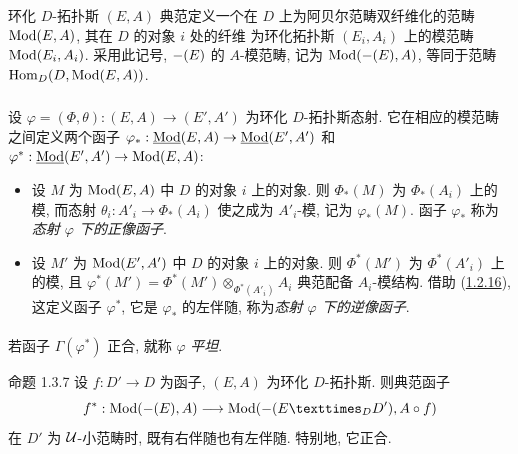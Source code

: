 \subsubsection{}
环化 $D$-拓扑斯 $(E,A)$ 典范定义一个在 $D$ 上为阿贝尔范畴双纤维化的范畴
$\Ysheaf{\Mod}(E,A)$, 其在 $D$ 的对象 $i$ 处\pageoriginale{}的纤维
为环化拓扑斯 $(E_i,A_i)$ 上的模范畴 $\operatorname{Mod}(E_i,A_i)$.
采用此记号, $\Ysheaf{\Gamma}(E)$ 的 $A$-模范畴,
记为 $\Mod(\Ysheaf{\Gamma}(E),A)$,
等同于范畴 $\Hom_D(D,\Ysheaf{\Mod}(E,A))$.

\subsubsection{}
设 $\varphi=(\Phi,\theta):(E,A)\to(E',A')$ 为环化 $D$-拓扑斯态射.
它在相应的模范畴之间定义两个函子
$\varphi_{\ast}:\underline{\Mod}(E,A)\to\underline{\Mod}(E',A')$ 和
$\varphi^{\ast}:\underline{\Mod}(E',A')\to\Mod(E,A)$:

\begin{itemize}
\item 设 $M$ 为 $\Ysheaf{\Mod}(E,A)$ 中 $D$ 的对象 $i$ 上的对象.
则 $\Phi_{\ast}(M)$ 为 $\Phi_{\ast}(A_i)$ 上的模,
而态射 $\theta_i:A'_i\to\Phi_{\ast}(A_i)$ 使之成为 $A'_i$-模,
记为 $\varphi_{\ast}(M)$. 函子 $\varphi_{\ast}$ 称为\emph{态射 $\varphi$ 下的正像函子}.

\item 设 $M'$ 为 $\Ysheaf{\Mod}(E',A')$ 中 $D$ 的对象 $i$ 上的对象.
则 $\Phi^{\ast}(M')$ 为 $\Phi^{\ast}(A'_i)$ 上的模,
且 $\varphi^{\ast}(M')=\Phi^{\ast}(M')\otimes_{\Phi^{\ast}(A'_i)}A_i$
典范配备 $A_i$-模结构. 借助 (\hyperref[Vbis.lem1.2.16]{1.2.16}),
这定义函子 $\varphi^{\ast}$, 它是 $\varphi_{\ast}$ 的左伴随,
称为\emph{态射 $\varphi$ 下的逆像函子}.
\end{itemize}

\paragraph{}
若函子 $\Gamma(\varphi^{\ast})$ 正合, 就称 $\varphi$ \emph{平坦}.

\begin{enonce*}{命题 1.3.7}
设 $f:D'\to D$ 为函子, $(E,A)$ 为环化 $D$-拓扑斯.
则典范函子
$$
f^{\ast}:\Mod(\Ysheaf{\Gamma}(E),A)\longrightarrow
\Mod(\Ysheaf{\Gamma}(\fprod{E}{D'}{D}),A\circ f)
$$
在 $D'$ 为 ${\mathcal U}$-小范畴时, 既有右伴随也有左伴随. 特别地, 它正合.
\end{enonce*}

